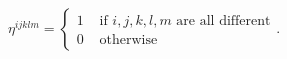 \begin{equation}
\label{etasymbol}
\eta^{ijklm} = \left\{ \begin{array}{rl} 1 & \mbox{ if } i,j,k,l,m 
\mbox{ are all
different} \\ 0 & \mbox{ otherwise} \end{array} \right..
\end{equation}

